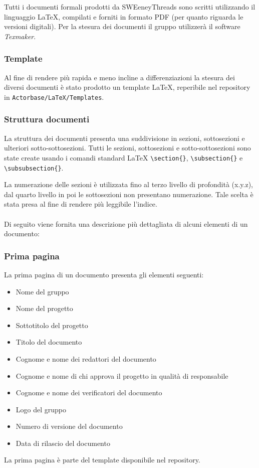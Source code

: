 \documentclass[a4paper]{article}
\begin{document}
		Tutti i documenti formali prodotti da SWEeneyThreads sono scritti utilizzando il linguaggio \LaTeX,
		compilati e forniti in formato PDF (per quanto riguarda le versioni digitali). Per la stesura dei
		documenti il gruppo utilizzerà il software \emph{Texmaker}.
		\subsubsection{Template}
		Al fine di rendere più rapida e meno incline a differenziazioni la stesura dei diversi documenti è stato prodotto un
		template \LaTeX, reperibile nel repository in \verb|Actorbase/LaTeX/Templates|.
		\subsubsection{Struttura documenti}
		La struttura dei documenti presenta una suddivisione in sezioni, sottosezioni e ulteriori sotto-sottosezioni.
		Tutti le sezioni, sottosezioni e sotto-sottosezioni sono state create usando i comandi standard \LaTeX \space
		\verb|\section{}|, \verb|\subsection{}| e \verb|\subsubsection{}|.

		La numerazione delle sezioni è utilizzata fino al terzo livello di profondità (x.y.z), dal quarto livello in poi le sottosezioni
		 non presentano numerazione. Tale scelta è stata presa al fine di rendere più leggibile l'indice.
		\\ \\
		Di seguito viene fornita una descrizione più dettagliata di alcuni elementi di un documento:
		\subsubsection{Prima pagina}
		La prima pagina di un documento presenta gli elementi seguenti:
		\begin{itemize}
			\item Nome del gruppo
			\item Nome del progetto
			\item Sottotitolo del progetto
			\item Titolo del documento
			\item Cognome e nome dei redattori del documento
			\item Cognome e nome di chi approva il progetto in qualità di responsabile
			\item Cognome e nome dei verificatori del documento
			\item Logo del gruppo
			\item Numero di versione del documento
			\item Data di rilascio del documento
		\end{itemize}
		La prima pagina è parte del template disponibile nel repository.
		
\end{document}
